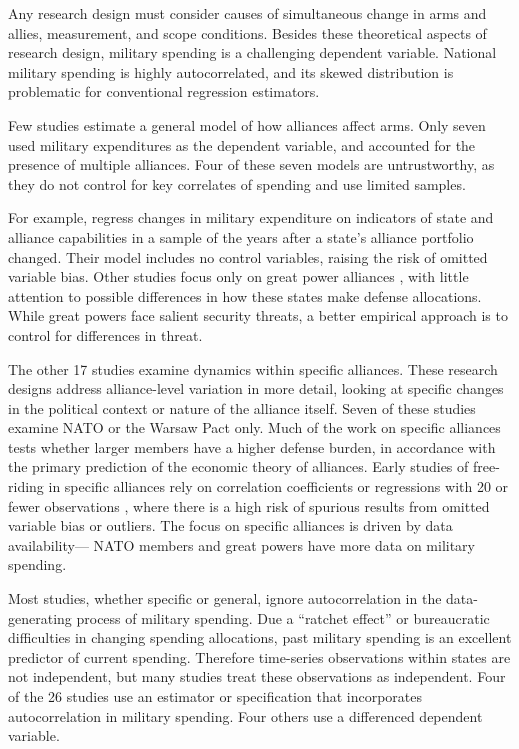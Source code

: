 \documentclass[12pt]{article}
\begin{document}
Any research design must consider causes of simultaneous change in arms and allies, measurement, and scope conditions. Besides these theoretical aspects of research design, military spending is a challenging dependent variable. National military spending is highly autocorrelated, and its skewed distribution is problematic for conventional regression estimators. 

Few studies estimate a general model of how alliances affect arms. Only seven used military expenditures as the dependent variable, and accounted for the presence of multiple alliances. Four of these seven models are untrustworthy, as they do not control for key correlates of spending and use limited samples. 

For example, \citet{MorganPalmer2003} regress changes in military expenditure on indicators of state and alliance capabilities in a sample of the years after a state's alliance portfolio changed. Their model includes no control variables, raising the risk of omitted variable bias. Other studies focus only on great power alliances \citep{ConybeareSandler1990, Conybeare1994, Diehl1994, MostSiverson1987}, with little attention to possible differences in how these states make defense allocations. While great powers face salient security threats, a better empirical approach is to control for differences in threat. 

The other 17 studies examine dynamics within specific alliances. These research designs address alliance-level variation in more detail, looking at specific changes in the political context or nature of the alliance itself. Seven of these studies examine NATO or the Warsaw Pact only. Much of the work on specific alliances tests whether larger members have a higher defense burden, in accordance with the primary prediction of the economic theory of alliances. Early studies of free-riding in specific alliances rely on correlation coefficients or regressions with 20 or fewer observations \citep{OlsonZeckhauser1966, Starr1974, Reisinger1983, Siroky2012}, where there is a high risk of spurious results from omitted variable bias or outliers. The focus on specific alliances is driven by data availability--- NATO members and great powers have more data on military spending. 

Most studies, whether specific or general, ignore autocorrelation in the data-generating process of military spending. Due a ``ratchet effect'' or bureaucratic difficulties in changing spending allocations, past military spending is an excellent predictor of current spending. Therefore time-series observations within states are not independent, but many studies treat these observations as independent. Four of the 26 studies use an estimator or specification that incorporates autocorrelation in military spending. Four others use a differenced dependent variable. 
\end{document}
